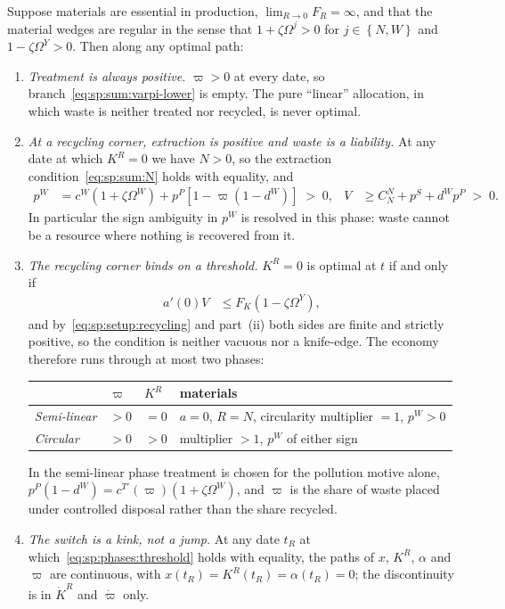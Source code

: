 \begin{proposition}\label{prop:sp:phases}
Suppose materials are essential in production, $\lim_{R\to0}F_R=\infty$, and that the material wedges
are regular in the sense that $1+\zeta\Omega^j>0$ for $j\in\left\{N,W\right\}$ and
$1-\zeta\Omega^Y>0$. Then along any optimal path:
\begin{enumerate}[label=\emph{(\roman*)},leftmargin=2.6em]
\item \emph{Treatment is always positive.} $\varpi>0$ at every date, so
branch~\eqref{eq:sp:sum:varpi-lower} is empty. The pure ``linear'' allocation, in which waste is
neither treated nor recycled, is never optimal.

\item \emph{At a recycling corner, extraction is positive and waste is a liability.} At any date at
which $K^R=0$ we have $N>0$, so the extraction condition~\eqref{eq:sp:sum:N} holds with equality, and
\begin{align}
p^W &= c^W\left(1+\zeta\Omega^W\right)+p^P\left[1-\varpi\left(1-d^W\right)\right] \;>\;0,
&
V &\ge C^N_N+p^S+d^Wp^P\;>\;0 .
\label{eq:sp:phases:corner-prices}
\end{align}
In particular the sign ambiguity in $p^W$ is resolved in this phase: waste cannot be a resource where
nothing is recovered from it.

\item \emph{The recycling corner binds on a threshold.} $K^R=0$ is optimal at $t$ if and only if
\begin{align}
a'\!\left(0\right) V &\le F_K\left(1-\zeta\Omega^Y\right),
\label{eq:sp:phases:threshold}
\end{align}
and by~\eqref{eq:sp:setup:recycling} and part~(ii) both sides are finite and strictly positive, so the
condition is neither vacuous nor a knife-edge. The economy therefore runs through at most two phases:
\begin{center}
\begin{tabular}{llll}
\toprule
& $\varpi$ & $K^R$ & materials \\
\midrule
\emph{Semi-linear} & $>0$ & $=0$ & $a=0$, $R=N$, circularity multiplier $=1$, $p^W>0$ \\
\emph{Circular} & $>0$ & $>0$ & multiplier $>1$, $p^W$ of either sign \\
\bottomrule
\end{tabular}
\end{center}
In the semi-linear phase treatment is chosen for the pollution motive alone, $p^P\left(1-d^W\right)=
c^{T\prime}\left(\varpi\right)\left(1+\zeta\Omega^W\right)$, and $\varpi$ is the share of waste placed
under controlled disposal rather than the share recycled.

\item \emph{The switch is a kink, not a jump.} At any date $t_R$ at which~\eqref{eq:sp:phases:threshold}
holds with equality, the paths of $x$, $K^R$, $\alpha$ and $\varpi$ are continuous, with
$x\left(t_R\right)=K^R\left(t_R\right)=\alpha\left(t_R\right)=0$; the discontinuity is in $\dot K^R$
and $\dot\varpi$ only.
\end{enumerate}
\end{proposition}

